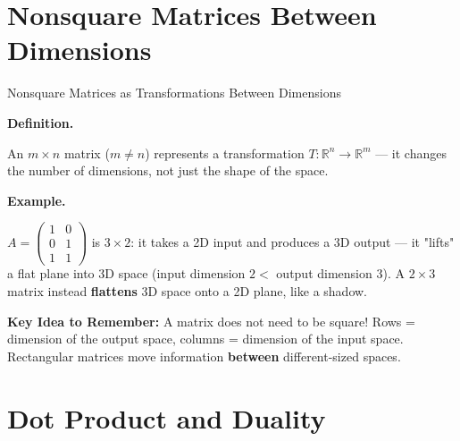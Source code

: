 \documentclass[9pt,aspectratio=169]{beamer}
\newcommand{\keyidea}[1]{%
\par\medskip\noindent\textbf{Key Idea to Remember:} #1\par\medskip}
\begin{document}
\section{Nonsquare Matrices Between Dimensions}

\begin{frame}{Nonsquare Matrices as Transformations Between Dimensions}
\par\noindent\textbf{Definition.}\par
An $m \times n$ matrix ($m \neq n$) represents a transformation
$T:\mathbb{R}^n \to \mathbb{R}^m$ --- it changes the number of dimensions, not just the
shape of the space.
\medskip


\par\noindent\textbf{Example.}\par
$A = \begin{pmatrix} 1 & 0 \\ 0 & 1 \\ 1 & 1 \end{pmatrix}$ is $3\times 2$: it takes a 2D
input and produces a 3D output --- it "lifts" a flat plane into 3D space (input dimension
$2 <$ output dimension $3$).
A $2\times 3$ matrix instead \textbf{flattens} 3D space onto a 2D plane, like a shadow.
\medskip


\keyidea{A matrix does not need to be square! Rows = dimension of the output space,
columns = dimension of the input space. Rectangular matrices move information
\textbf{between} different-sized spaces.}
\end{frame}

\section{Dot Product and Duality}
\end{document}
